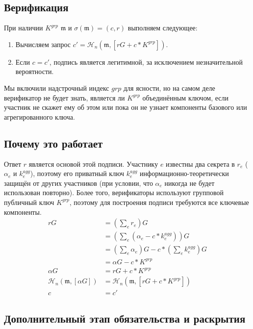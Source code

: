 \subsection*{Верификация}

При наличии $K^{grp}$ $\mathfrak{m}$ и $\sigma(\mathfrak{m}) = (c,r)$ выполняем следующее:
\begin{enumerate}
    \item Вычисляем запрос $c' = \mathcal{H}_n(\mathfrak{m},[r G + c*K^{grp}])$.
    \item Если $c = c'$, подпись является легитимной, за исключением незначительной вероятности.
\end{enumerate}

Мы включили надстрочный индекс $grp$ для ясности, но на самом деле верификатор не будет знать, является ли $K^{grp}$ объединённым ключом, если участник не скажет ему об этом или пока он не узнает компоненты базового или агрегированного ключа.


\subsection*{Почему это работает}

Ответ $r$ является основой этой подписи. Участнику $e$ известны два секрета в $r_e$ ($\alpha_e$ и $k^{agg}_e$), поэтому его приватный ключ $k^{agg}_e$ информационно-теоретически защищён от других участников (при условии, что $\alpha_e$ никогда не будет использован повторно). Более того, вери\-фикаторы используют групповой публичный ключ $K^{grp}$, поэтому для построения подписи требуются все ключевые компоненты.
\begin{align*}
    r G &= (\sum_e r_e) G \\
      &= (\sum_e (\alpha_e - c*k^{agg}_e)) G \\
      &= (\sum_e \alpha_e) G - c*(\sum_e k^{agg}_e) G \\
      &= \alpha G - c*K^{grp} \\
    \alpha G &= r G + c*K^{grp} \\
    \mathcal{H}_n(\mathfrak{m},[\alpha G]) &= \mathcal{H}_n(\mathfrak{m},[r G + c*K^{grp}]) \\
    c &= c'
\end{align*}


\subsection*{Дополнительный этап обязательства и раскрытия}

